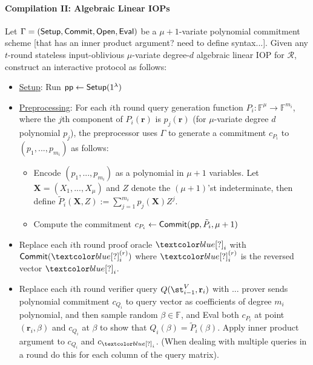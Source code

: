 \paragraph{Compilation II: Algebraic Linear IOPs} 
Let $\Gamma = (\textsf{{Setup}}, \textsf{{Commit}}, \textsf{{Open}}, \textsf{{Eval}})$ be a $\mu+1$-variate polynomial commitment scheme [that has an inner product argument? need to define syntax...]. Given any $t$-round stateless input-oblivious $\mu$-variate degree-$d$ algebraic linear IOP for $\mathcal{R}$, construct an interactive protocol as follows: 
\begin{itemize}
\item \underline{Setup}: Run $\textsf{pp} \leftarrow \textsf{{Setup}}(1^\lambda)$
\item \underline{Preprocessing}: For each $i$th round query generation function $P_i: \mathbb{F}^\mu \rightarrow \mathbb{F}^{m_i}$, where the $j$th component of $P_i(\mathbf{r})$ is $p_j(\mathbf{r})$ (for $\mu$-variate degree $d$ polynomial $p_j$), the preprocessor uses $\Gamma$ to generate a commitment $c_{P_i}$ to $(p_1,..., p_{m_i})$ as follows: 
    \begin{itemize}
    \item Encode $(p_1,...,p_{m_i})$ as a polynomial in $\mu + 1$ variables. Let $\mathbf{X} = (X_1,...,X_\mu)$ and $Z$ denote the $(\mu+1)$'st indeterminate, then define $\tilde{P}_i(\mathbf{X}, Z) := \sum_{j=1}^{m_i} p_j(\mathbf{X}) Z^j$.
    \item Compute the commitment $c_{P_i} \leftarrow \textsf{{Commit}}(\textsf{pp}, \tilde{P}_i, \mu + 1)$
    \end{itemize}
\item Replace each $i$th round proof oracle $\proof_i$ with $\pro{Commit}(\proof_i^{(r)})$ where $\proof_i^{(r)}$ is the reversed vector $\proof_i$.  

\item Replace each $i$th round verifier query $Q(\st^V_{i-1}, \mathbf{r}_i)$ with ... prover sends polynomial commitment $c_{Q_i}$ to query vector as coefficients of degree $m_i$ polynomial, and then sample random $\beta \in \mathbb{F}$, and Eval both $c_{P_i}$ at point $(\mathbf{r}_i, \beta)$ and $c_{Q_i}$ at $\beta$ to show that $Q_i(\beta) = \tilde{P}_i(\beta)$. Apply inner product argument to $c_{Q_i}$ and $c_{\proof_i}$. (When dealing with multiple queries in a round do this for each column of the query matrix).  
\end{itemize}






